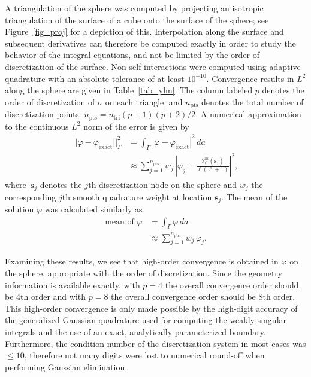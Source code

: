 \documentclass[11pt]{article}
\renewcommand{\phi}{\varphi}
\newcommand{\phiexact}{\phi_{\text{exact}}}
\newcommand{\bs}{\bm s}
\newcommand{\ntri}{n_{\text{tri}}}
\newcommand{\npts}{n_{\text{pts}}}
\numberwithin{equation}{section}
\begin{document}
A triangulation of the sphere was computed by projecting an isotropic
triangulation of the surface of a cube onto the surface of the sphere;
see Figure~\ref{fig_proj} for a depiction of this.
Interpolation along the surface and subsequent derivatives can therefore
be computed exactly in order to study the behavior of the
integral equations, and not be limited by the order of discretization
of the surface.
Non-self interactions were computed using adaptive quadrature
with an absolute tolerance of at least $10^{-10}$.
Convergence results in $L^2$ along the sphere are given in
Table~\ref{tab_ylm}. The column labeled $p$ denotes the order of
discretization of $\sigma$ on each triangle, and $\npts$ denotes the
total number of discretization points: $\npts = \ntri (p+1)(p+2)/2$.
A numerical approximation to
the continuous $L^2$ norm of the error is given by
\begin{equation}
  \begin{aligned}
||\phi - \phiexact||_\Gamma^2 &= \int_\Gamma |\phi - \phiexact|^2 \,
da \\
&\approx \sum_{j=1}^{\npts} w_j \, \left| \phi_j +
  \frac{Y_\ell^m (\bs_j) }{\ell(\ell+1)}  \right|^2,
\end{aligned}
\end{equation}
where~$\bs_j$ denotes the $j$th discretization node on the sphere
and $w_j$ the corresponding $j$th smooth quadrature weight at location
$\bs_j$.
The mean of the solution $\phi$ was calculated similarly as
\begin{equation}
  \begin{aligned}
    \text{mean of } \phi &= \int_\Gamma \phi \, da \\
    &\approx \sum_{j=1}^{\npts} w_j \, \phi_j.
  \end{aligned}
\end{equation}

Examining these results, we see that high-order convergence is
obtained in $\phi$ on the sphere, appropriate with the order of
discretization. Since the geometry information is available exactly,
with $p=4$ the overall convergence order should be 4th order and with
$p=8$ the overall convergence order should be 8th order.
This high-order convergence is only made possible by
the high-digit accuracy of the generalized Gaussian quadrature used
for computing the weakly-singular integrals and the use of an exact,
analytically parameterized boundary. Furthermore, the condition number
of the discretization system in most cases was $\leq 10$, therefore
not many digits were lost to numerical round-off when performing
Gaussian elimination.
\end{document}
